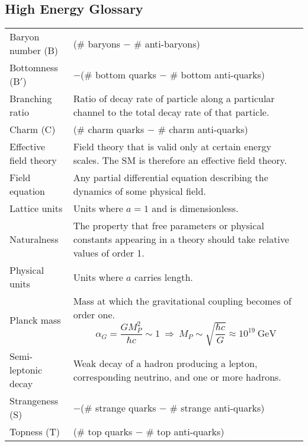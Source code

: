 \documentclass[12pt]{book}
\theoremstyle{definition}
\newenvironment{frontstuff}
  {\centering\chapter*{}}
  {\clearpage}
\begin{document}
\begin{frontstuff}
\section*{High Energy Glossary}
\begin{tabularx}{\linewidth}{lL}
Baryon number (B)& 
  (\# baryons $-$ \# anti-baryons)
\vspace{2mm}\\
Bottomness (B$'$)& 
  $-$(\# bottom quarks $-$ \# bottom anti-quarks)
\vspace{2mm}\\
Branching ratio& 
  Ratio of decay rate of particle along a particular channel
  to the total decay rate of that particle.
\vspace{2mm}\\
Charm (C)& 
  (\# charm quarks $-$ \# charm anti-quarks)
\vspace{2mm}\\
Effective field theory&
  Field theory that is valid only at certain energy scales. The SM is 
  therefore an effective field theory.
\vspace{2mm}\\
Field equation&
  Any partial differential equation describing the dynamics of
  some physical field.
\vspace{2mm}\\
Lattice units&
  Units where $a=1$ and is dimensionless.
\vspace{2mm}\\
Naturalness&
  The property that free parameters or physical constants appearing in a theory
  should take relative values of order 1.
\vspace{2mm}\\
Physical units& 
  Units where $a$ carries length. 
\vspace{2mm}\\
Planck mass&
  Mass at which the gravitational coupling becomes of order one.
  $$
    \alpha_G=\frac{GM_P^2}{\hbar c}\sim1~\Rightarrow~
     M_P\sim\sqrt{\frac{\hbar c}{G}}\approx10^{19}~\text{GeV}
  $$
\vspace{2mm}\\
Semi-leptonic decay& 
  Weak decay of a hadron producing a lepton, corresponding neutrino,
  and one or more hadrons. 
\vspace{2mm}\\
Strangeness (S)& 
  $-$(\# strange quarks $-$ \# strange anti-quarks)
\vspace{2mm}\\
Topness (T)& 
  (\# top quarks $-$ \# top anti-quarks)
\end{tabularx}


\end{frontstuff}
\end{document}
